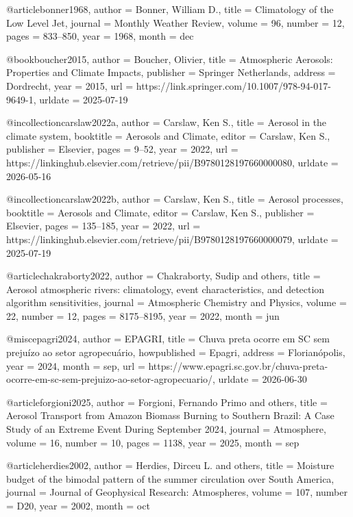 @article{bonner1968,
	author  = {Bonner, William D.},
	title   = {Climatology of the Low Level Jet},
	journal = {Monthly Weather Review},
	volume  = {96},
	number  = {12},
	pages   = {833--850},
	year    = {1968},
	month   = {dec}
}

@book{boucher2015,
	author    = {Boucher, Olivier},
	title     = {Atmospheric Aerosols: Properties and Climate Impacts},
	publisher = {Springer Netherlands},
	address   = {Dordrecht},
	year      = {2015},
	url       = {https://link.springer.com/10.1007/978-94-017-9649-1},
	urldate   = {2025-07-19}
}

@incollection{carslaw2022a,
	author    = {Carslaw, Ken S.},
	title     = {Aerosol in the climate system},
	booktitle = {Aerosols and Climate},
	editor    = {Carslaw, Ken S.},
	publisher = {Elsevier},
	pages     = {9--52},
	year      = {2022},
	url       = {https://linkinghub.elsevier.com/retrieve/pii/B9780128197660000080},
	urldate   = {2026-05-16}
}

@incollection{carslaw2022b,
	author    = {Carslaw, Ken S.},
	title     = {Aerosol processes},
	booktitle = {Aerosols and Climate},
	editor    = {Carslaw, Ken S.},
	publisher = {Elsevier},
	pages     = {135--185},
	year      = {2022},
	url       = {https://linkinghub.elsevier.com/retrieve/pii/B9780128197660000079},
	urldate   = {2025-07-19}
}

@article{chakraborty2022,
	author  = {Chakraborty, Sudip and others},
	title   = {Aerosol atmospheric rivers: climatology, event characteristics, and detection algorithm sensitivities},
	journal = {Atmospheric Chemistry and Physics},
	volume  = {22},
	number  = {12},
	pages   = {8175--8195},
	year    = {2022},
	month   = {jun}
}

@misc{epagri2024,
	author       = {{EPAGRI}},
	title        = {Chuva preta ocorre em SC sem prejuízo ao setor agropecuário},
	howpublished = {Epagri},
	address      = {Florianópolis},
	year         = {2024},
	month        = {sep},
	url          = {https://www.epagri.sc.gov.br/chuva-preta-ocorre-em-sc-sem-prejuizo-ao-setor-agropecuario/},
	urldate      = {2026-06-30}
}

@article{forgioni2025,
	author  = {Forgioni, Fernando Primo and others},
	title   = {Aerosol Transport from Amazon Biomass Burning to Southern Brazil: A Case Study of an Extreme Event During September 2024},
	journal = {Atmosphere},
	volume  = {16},
	number  = {10},
	pages   = {1138},
	year    = {2025},
	month   = {sep}
}

@article{herdies2002,
	author  = {Herdies, Dirceu L. and others},
	title   = {Moisture budget of the bimodal pattern of the summer circulation over South America},
	journal = {Journal of Geophysical Research: Atmospheres},
	volume  = {107},
	number  = {D20},
	year    = {2002},
	month   = {oct}
}

